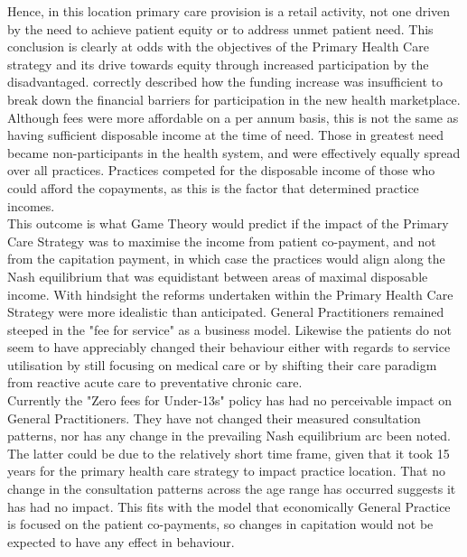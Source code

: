\documentclass[11pt,a4paper]{article}
\begin{document}
Hence, in this location primary care provision is a retail activity, not one driven by the need to achieve patient equity or to address unmet patient need. This conclusion is clearly at odds with the objectives of the Primary Health Care strategy and its drive towards equity through increased participation by the disadvantaged. \citet{cumming2008reforming} correctly described how the funding increase was insufficient to break down the financial barriers for participation in the new health marketplace. Although fees were more affordable on a per annum basis, this is not the same as having sufficient disposable income at the time of need. Those in greatest need became non-participants in the health system, and were effectively equally spread over all practices. Practices competed for the disposable income of those who could afford the copayments, as this is the factor that determined practice incomes.\\


This outcome is what Game Theory would predict if the impact of the Primary Care Strategy was to maximise the income from patient co-payment, and not from the capitation payment, in which case  the practices would align along the Nash equilibrium that was equidistant between areas of maximal disposable income. With hindsight the reforms undertaken within the Primary Health Care Strategy were more idealistic than anticipated. General Practitioners remained steeped in the "fee for service" as a business model. Likewise the patients do not seem to have appreciably changed their behaviour either with regards to service utilisation by still focusing on medical care or by shifting their care paradigm from reactive acute care to preventative chronic care. \\


Currently the "Zero fees for Under-13s" policy has had no perceivable impact on General Practitioners. They have not changed their measured consultation patterns, nor has any change in the prevailing Nash equilibrium arc been noted. The latter could be due to the relatively short time frame, given that it took 15 years for the primary health care strategy to impact practice location. That no change in the consultation patterns across the age range has occurred suggests it has had no impact. This fits with the model that economically General Practice is focused on the patient co-payments, so changes in capitation would not be expected to have any effect in behaviour.\\
\end{document}
